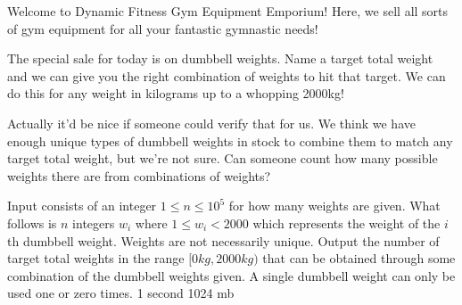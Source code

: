 {Welcome to Dynamic Fitness Gym Equipment Emporium! Here, we sell all sorts of gym equipment for all your fantastic gymnastic needs!

The special sale for today is on dumbbell weights. Name a target total weight and we can give you the right combination of weights to hit that target. We can do this for any weight in kilograms up to a whopping 2000kg!

Actually it'd be nice if someone could verify that for us. We think we have enough unique types of dumbbell weights in stock to combine them to match any target total weight, but we're not sure. Can someone count how many possible weights there are from combinations of weights?}
{Input consists of an integer $1 \le n \le 10^5$ for how many weights are given. What follows is $n$ integers $w_i$ where $1 \le w_i < 2000$ which represents the weight of the $i$th dumbbell weight. Weights are not necessarily unique.}
{Output the number of target total weights in the range $[0kg,2000kg)$ that can be obtained through some combination of the dumbbell weights given. A single dumbbell weight can only be used one or zero times.}
{1 second}
{1024 mb}
{
}